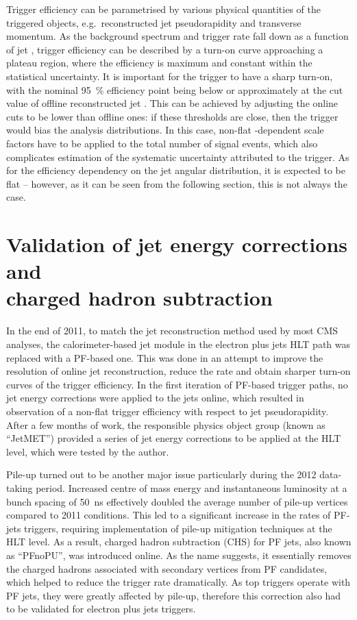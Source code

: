 Trigger efficiency can be parametrised by various physical quantities of the triggered objects, e.g.\ reconstructed jet
pseudorapidity and transverse momentum. As the background spectrum and trigger rate fall down as a function of jet \pt,
trigger efficiency can be described by a turn-on curve approaching a plateau region, where the efficiency is maximum and
constant within the statistical uncertainty. It is important for the trigger to have a sharp turn-on, with the nominal
\SI{95}{\percent} efficiency point being below or approximately at the cut value of offline reconstructed jet \pt. This
can be achieved by adjusting the online cuts to be lower than offline ones: if these thresholds are close, then the
trigger would bias the analysis distributions. In this case, non-flat \pt-dependent scale factors have to be applied to
the total number of signal events, which also complicates estimation of the systematic uncertainty attributed to the
trigger. As for the efficiency dependency on the jet angular distribution, it is expected to be flat -- however, as it
can be seen from the following section, this is not always the case.

\section[{Validation of jet energy corrections and charged hadron subtraction}]{Validation of jet energy corrections and
\\charged hadron subtraction}
\label{s:JEC_PFnoPU_validation}
In the end of 2011, to match the jet reconstruction method used by most CMS analyses, the calorimeter-based jet module
in the electron plus jets HLT path was replaced with a PF-based one. This was done in an attempt to improve the \pt
resolution of online jet reconstruction, reduce the rate and obtain sharper turn-on curves of the trigger efficiency. In
the first iteration of PF-based trigger paths, no jet energy corrections were applied to the jets online, which resulted
in observation of a non-flat trigger efficiency with respect to jet pseudorapidity. After a few months of work, the
responsible physics object group (known as ``JetMET'') provided a series of jet energy corrections to be applied at the
HLT level, which were tested by the author.

Pile-up turned out to be another major issue particularly during the 2012 data-taking period. Increased centre of mass
energy and instantaneous luminosity at a bunch spacing of \SI{50}{\ns} effectively doubled the average number of pile-up
vertices compared to 2011 conditions. This led to a significant increase in the rates of PF-jets triggers, requiring
implementation of pile-up mitigation techniques at the HLT level. As a result, charged hadron subtraction (CHS) for PF
jets, also known as ``PFnoPU'', was introduced online. As the name suggests, it essentially removes the charged hadrons
associated with secondary vertices from PF candidates, which helped to reduce the trigger rate dramatically. As top
triggers operate with PF jets, they were greatly affected by pile-up, therefore this correction also had to be validated
for electron plus jets triggers.


